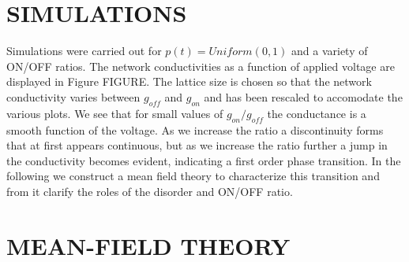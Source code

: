 \documentclass[aps,prl,preprint,groupedaddress]{revtex4-1}
\begin{document}
\section{SIMULATIONS}

Simulations were carried out for $p(t) = Uniform(0, 1)$ and a variety of
ON/OFF ratios. The network conductivities as a function of applied voltage
are displayed in Figure FIGURE. The lattice size is chosen so that the
network conductivity varies between $g_{off}$ and $g_{on}$ and has been
rescaled to accomodate the various plots.  We see that for small values
of $g_{on}/g_{off}$ the conductance is a smooth function of the voltage.
As we increase the ratio a discontinuity forms that at first appears
continuous, but as we increase the ratio further a jump in the
conductivity becomes evident, indicating a first order
phase transition. In the following we construct a mean field theory to
characterize this transition and from it clarify the roles of the disorder and
ON/OFF ratio.

\section{MEAN-FIELD THEORY}
\end{document}
